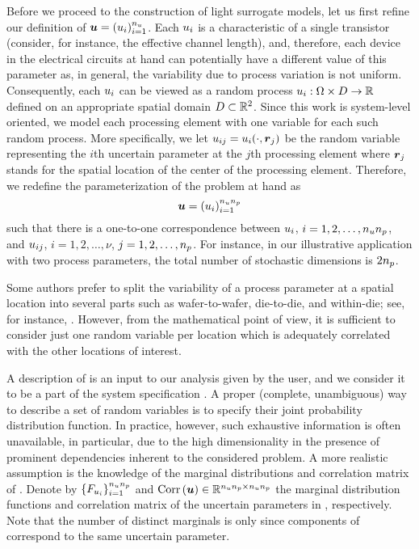 Before we proceed to the construction of light surrogate models, let us first
refine our definition of $\boldsymbol{u} = (u_i)_{i = 1}^{n_{u}}$. Each $u_i$ is a
characteristic of a single transistor (consider, for instance, the effective
channel length), and, therefore, each device in the electrical circuits at hand
can potentially have a different value of this parameter as, in general, the
variability due to process variation is not uniform. Consequently, each $u_i$
can be viewed as a random process $u_i: \Omega \times D \to \mathbb{R}$ defined on
an appropriate spatial domain $D \subset \mathbb{R}^2$. Since this work is
system-level oriented, we model each processing element with one variable for
each such random process. More specifically, we let $u_{ij} = u_i(\cdot,
\boldsymbol{r}_j)$ be the random variable representing the $i$th uncertain parameter at
the $j$th processing element where $\boldsymbol{r}_j$ stands for the spatial location of
the center of the processing element. Therefore, we redefine the
parameterization \vu of the problem at hand as
\[
  \boldsymbol{u} = (u_i)_{i = 1}^{{n_{u}} {n_{p}}}
\]
such that there is a one-to-one correspondence between $u_i$, $i = 1, 2, \dots,
{n_{u}} {n_{p}}$, and $u_{ij}$, $i = 1, 2, \dots, \nu$, $j = 1, 2, \dots, {n_{p}}$. For
instance, in our illustrative application with two process parameters, the total
number of stochastic dimensions is $2 {n_{p}}$.

\begin{remark}
Some authors prefer to split the variability of a process parameter at a spatial
location into several parts such as wafer-to-wafer, die-to-die, and within-die;
see, for instance, \cite{juan2012}. However, from the mathematical point of
view, it is sufficient to consider just one random variable per location which
is adequately correlated with the other locations of interest.
\end{remark}

A description of \vu is an input to our analysis given by the user, and we
consider it to be a part of the system specification \spec. A proper (complete,
unambiguous) way to describe a set of random variables is to specify their joint
probability distribution function. In practice, however, such exhaustive
information is often unavailable, in particular, due to the high dimensionality
in the presence of prominent dependencies inherent to the considered problem. A
more realistic assumption is the knowledge of the marginal distributions and
correlation matrix of \vu. Denote by $\{ F_{u_i} \}_{i = 1}^{{n_{u}} {n_{p}}}$ and
$\correlation{\vu} \in \real^{\nu \np \times \nu \np}$ the marginal distribution
functions and correlation matrix of the uncertain parameters \vu in
, respectively. Note that the number of distinct
marginals is only \nu since \np components of \vu correspond to the same
uncertain parameter.

